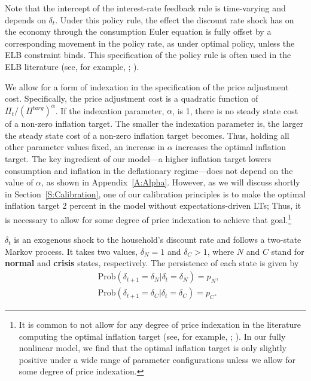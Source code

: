 \documentclass[11pt]{article}
\begin{document}
	Note that the intercept of the interest-rate feedback rule is time-varying and depends on $\delta_{t}$. Under this policy rule, the effect the discount rate shock has on the economy through the consumption Euler equation is fully offset by a corresponding movement in the policy rate, as under optimal policy, unless the ELB constraint binds. This specification of the policy rule is often used in the ELB literature (see, for example, \citet{BonevaBraunWaki2016}; \citet{Eggertsson2011}). 
	
	We allow for a form of indexation in the specification of the price adjustment cost. Specifically, the price adjustment cost is a quadratic function of $\Pi_{t}/(\Pi^{targ})^{\alpha}$. If the indexation parameter, $\alpha$, is 1, there is no steady state cost of a non-zero inflation target. The smaller the indexation parameter is, the larger the steady state cost of a non-zero inflation target becomes. Thus, holding all other parameter values fixed, an increase in $\alpha$ increases the optimal inflation target. The key ingredient of our model---a higher inflation target lowers consumption and inflation in the deflationary regime---does not depend on the value of $\alpha$, as shown in Appendix~\ref{A:Alpha}. However, as we will discuss shortly in Section~\ref{S:Calibration}, one of our calibration principles is to make the optimal inflation target 2 percent in the model without expectations-driven LTs; Thus, it is necessary to allow for some degree of price indexation to achieve that goal.\footnote{It is common to not allow for any degree of price indexation in the literature computing the optimal inflation target (see, for example, \citet{CoibionGorodnichenkoWieland2012};  \citet{AndradeGaliLeBihanMatheron2018}). In our fully nonlinear model, we find that the optimal inflation target is only slightly positive under a wide range of parameter configurations unless we allow for some degree of price indexation.}
	
	$\delta_{t}$ is an exogenous shock to the household's discount rate and follows a two-state Markov process. It takes two values, $\delta_{N}=1$ and $\delta_{C}>1$, where $N$ and $C$ stand for \textbf{normal} and \textbf{crisis} states, respectively. The persistence of each state is given by
	\begin{align}
		& \text{Prob}(\delta_{t+1}=\delta_{N}|\delta_{t}=\delta_{N})= p_{N},\\
		& \text{Prob}(\delta_{t+1}=\delta_{C}|\delta_{t}=\delta_{C})= p_{C}.
	\end{align}
	
\end{document}
